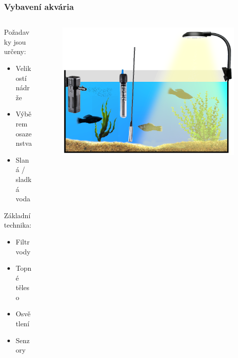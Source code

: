 \documentclass[%
  12pt,       				%
	t,                  %
	aspectratio=1610,   %
	unicode,						%
]{beamer}				    	%
\begin{document}
\begin{frame} 
	\frametitle{Vybavení akvária}
	
	\begin{columns}[T] 								%
		\begin{column}{0.4\textwidth}		%
			Požadavky jsou určeny:\\[0ex]
			\begin{itemize}
				\item Velikostí nádrže
				\item Výběrem osazenstva 
				\item Slaná / sladká voda 
			\end{itemize}

			\vspace{2ex}%
			Základní technika:\\[0ex]
			\begin{itemize}
				\item Filtr vody
				\item Topné těleso
				\item Osvětlení 
				\item Senzory
			\end{itemize}
		\end{column}
		\begin{column}{0.6\textwidth}		%
			\begin{figure}%
				\centering
				\includegraphics[width=\columnwidth]{obrazky/prezentace/vybaveni-akvaria/06-sensory.png}
			\end{figure}
		\end{column}
	\end{columns}											%
\end{frame}
\end{document}
